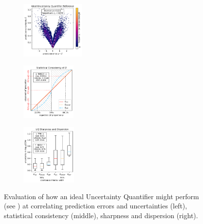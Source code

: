 \begin{figure}[H]
    \begin{subfigure}
    \centering
    \includegraphics[width=0.348\textwidth,valign=t]{uncertainty/figures/uq.optimaluncertaintyquantifiermodel-correlation.pdf}
    \end{subfigure}
    \begin{subfigure}
    \centering
    \includegraphics[width=0.299\textwidth,valign=t]{uncertainty/figures/uq.optimaluncertaintyquantifiermodel-consistency.pdf}
    \end{subfigure}
    \begin{subfigure}
    \centering
    \includegraphics[width=0.303\textwidth,valign=t]{uncertainty/figures/uq.optimaluncertaintyquantifiermodel-sharpness.pdf}
    \end{subfigure}
   
    \vspace{-1em}

    \caption[Reference Example of an ideal Uncertainty Quantifier]{Evaluation of how an ideal Uncertainty Quantifier might perform (see ) at correlating prediction errors and uncertainties (left), statistical consistency (middle), sharpness and dispersion (right).}
    \label{fig:uncertainty-ideal}
\end{figure}

